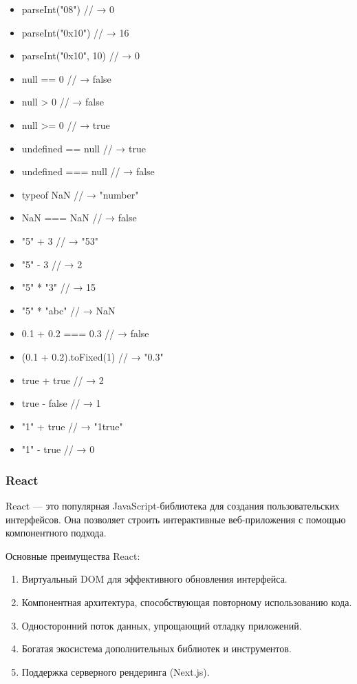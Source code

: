 \begin{itemize}
  \item parseInt("08") // → 0
  \item parseInt("0x10") // → 16
  \item parseInt("0x10", 10) // → 0
  \item null == 0 // → false
  \item null > 0 // → false
  \item null >= 0 // → true
  \item undefined == null // → true
  \item undefined === null // → false
  \item typeof NaN // → "number"
  \item NaN === NaN // → false
  \item "5" + 3 // → "53"
  \item "5" - 3 // → 2
  \item "5" * "3" // → 15
  \item "5" * "abc" // → NaN
  \item 0.1 + 0.2 === 0.3 // → false
  \item (0.1 + 0.2).toFixed(1) // → "0.3"
  \item true + true // → 2
  \item true - false // → 1
  \item "1" + true // → "1true"
  \item "1" - true // → 0
\end{itemize}

\subsubsection{React}
React — это популярная JavaScript-библиотека для создания пользовательских интерфейсов. Она позволяет строить интерактивные веб-приложения с помощью компонентного подхода.

Основные преимущества React:
\begin{enumerate}
\item Виртуальный DOM для эффективного обновления интерфейса.
\item Компонентная архитектура, способствующая повторному использованию кода.
\item Односторонний поток данных, упрощающий отладку приложений.
\item Богатая экосистема дополнительных библиотек и инструментов.
\item Поддержка серверного рендеринга (Next.js).
\end{enumerate}

